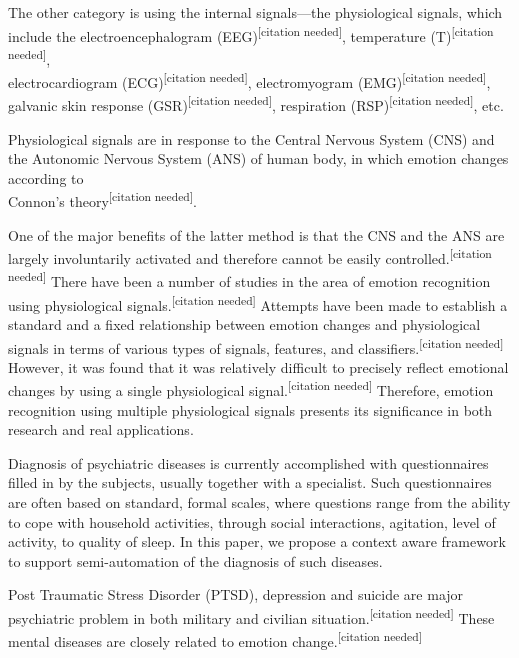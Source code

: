 \documentclass[11pt]{article}
\theoremstyle{definition}
\begin{document}
    The other category is using the internal signals—the physiological signals, which include the electroencephalogram (EEG)\textsuperscript{[citation needed]}, temperature (T)\textsuperscript{[citation needed]},\\electrocardiogram (ECG)\textsuperscript{[citation needed]}, electromyogram (EMG)\textsuperscript{[citation needed]},\\
     galvanic skin response (GSR)\textsuperscript{[citation needed]}, respiration (RSP)\textsuperscript{[citation needed]}, etc. 

    Physiological signals are in response to the Central Nervous System (CNS) and the Autonomic Nervous System (ANS) of human body, in which emotion changes according to \\Connon’s theory\textsuperscript{[citation needed]}.

    One of the major benefits of the latter method is that the CNS and the ANS are largely involuntarily activated and therefore cannot be easily controlled.\textsuperscript{[citation needed]}
    There have been a number of studies in the area of emotion recognition using physiological signals.\textsuperscript{[citation needed]}
    Attempts have been made to establish a standard and a fixed relationship between emotion changes and physiological signals in terms of various types of signals, features, and classifiers.\textsuperscript{[citation needed]}
    However, it was found that it was relatively difficult to precisely reflect emotional changes by using a single physiological signal.\textsuperscript{[citation needed]}
    Therefore, emotion recognition using multiple physiological signals presents its significance in both research and real applications. 

    Diagnosis of psychiatric diseases is currently accomplished with questionnaires filled in by the subjects, usually together with a specialist. 
    Such questionnaires are often based on standard, formal scales, where questions range from the ability to cope with household activities, through social interactions, agitation, level of activity, to quality of sleep. 
    In this paper, we propose a context aware framework to support semi-automation of the diagnosis of such diseases.

    Post Traumatic Stress Disorder (PTSD), depression and suicide are major psychiatric problem in both military and civilian situation.\textsuperscript{[citation needed]}
    These mental diseases are closely related to emotion change.\textsuperscript{[citation needed]}
    
\end{document}
